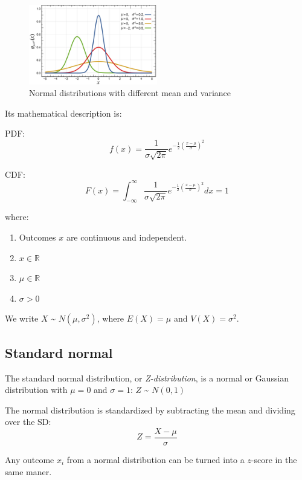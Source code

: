 \documentclass[
]{article}
\providecommand{\tightlist}{%
  \setlength{\itemsep}{0pt}\setlength{\parskip}{0pt}}
\begin{document}
\begin{figure}
\centering
\includegraphics[width=0.5\textwidth,height=\textheight]{Images/Normal_Distribution_PDF.png}
\caption{Normal distributions with different mean and variance}
\end{figure}

Its mathematical description is:

PDF: \[ f(x) = \frac{1}{\sigma\sqrt{2\pi}} e^{-\frac{1}{2} 
               \left(\frac{x-\mu}{\sigma}\right)^2} \]

CDF: \[ F(x) = \int_{-\infty}^{\infty}
               \frac{1}{\sigma\sqrt{2\pi}} e^{-\frac{1}{2} 
               \left(\frac{x-\mu}{\sigma}\right)^2}dx = 1 \]

where:

\begin{enumerate}
\def\labelenumi{\arabic{enumi}.}
\tightlist
\item
  Outcomes \(x\) are continuous and independent.
\item
  \(x \in \mathbb{R}\)
\item
  \(\mu \in \mathbb{R}\)
\item
  \(\sigma > 0\)
\end{enumerate}

We write \(X\) \textasciitilde{} \(N(\mu,\sigma^2)\), where
\(E(X) = \mu\) and \(V(X) = \sigma^2\).

\hypertarget{standard-normal}{%
\subsection{Standard normal}\label{standard-normal}}

The standard normal distribution, or \emph{Z-distribution}, is a normal
or Gaussian distribution with \(\mu = 0\) and \(\sigma = 1\): \(Z\)
\textasciitilde{} \(N(0,1)\)

The normal distribution is standardized by subtracting the mean and
dividing over the SD: \[ Z = \frac{X - \mu}{\sigma}\]

Any outcome \(x_i\) from a normal distribution can be turned into a
\(z\)-score in the same maner.
\end{document}
